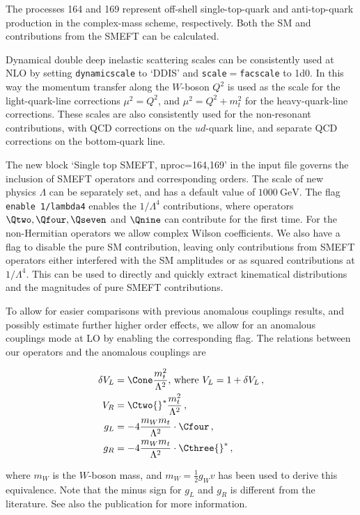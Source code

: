 The processes 164 and 169 represent off-shell single-top-quark and anti-top-quark production
in the complex-mass scheme, respectively. Both the SM and contributions from the SMEFT can be calculated.

Dynamical double deep inelastic scattering scales can be
consistently used at NLO by setting \texttt{dynamicscale} to `DDIS'
and \texttt{scale}$=$\texttt{facscale} to 1d0. In this way the
momentum transfer along the $W$-boson $Q^2$ is used as the scale for
the light-quark-line corrections $\mu^2=Q^2$, and $\mu^2=Q^2+m_t^2$ for
the heavy-quark-line corrections. These scales are also consistently
used for the non-resonant contributions, with QCD corrections on the
$ud$-quark line, and separate QCD corrections on the bottom-quark
line.

The new block `Single top SMEFT, nproc=164,169' in the input
file governs the inclusion of SMEFT operators and corresponding
orders.  The scale of new physics $\Lambda$ can be separately set, and
has a default value of $\SI{1000}{\GeV}$.  The flag \texttt{enable
	1/lambda4} enables the $1/\Lambda^4$ contributions, where operators
$\Qtwo, \Qfour, \Qseven$ and $\Qnine$ can contribute for the first
time.  For the non-Hermitian operators we allow complex Wilson
coefficients.  We also have a flag to disable the pure SM
contribution, leaving only contributions from SMEFT operators
either interfered with the SM amplitudes or as squared
contributions at $1/\Lambda^4$.  This can be used to directly and
quickly extract kinematical distributions and the magnitudes of
pure SMEFT contributions.

To allow for easier comparisons with previous anomalous couplings
results, and possibly estimate further higher order effects, we allow
for an anomalous couplings mode at LO by enabling the corresponding
flag.  The relations between our operators and the anomalous couplings
are

\begin{align*}
	 \delta V_L &= \Cone \frac{m_t^2}{\Lambda^2} ,\,\text{where } V_L = 1 + \delta V_L\,,\\
	 V_R &= \Ctwo{}^* \frac{m_t^2}{\Lambda^2}\,, \\
	 g_L &= -4\frac{m_W m_t}{\Lambda^2} \cdot \Cfour\,, \\
	 g_R &= -4 \frac{m_W m_t}{\Lambda^2} \cdot \Cthree{}^*\,,
\end{align*}

where $m_W$ is the $W$-boson mass, and $m_W = \frac{1}{2} g_W v$ has
been used to derive this equivalence.  Note that the minus sign for
$g_L$ and $g_R$ is different from the literature. See also the publication for more information.

